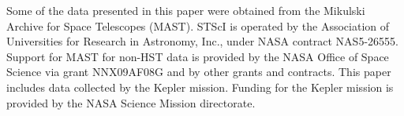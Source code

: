 \documentclass[useAMS, usenatbib, preprint, 12pt]{aastex}
\begin{document}
Some of the data presented in this paper were obtained from the Mikulski
Archive for Space Telescopes (MAST).
STScI is operated by the Association of Universities for Research in
Astronomy, Inc., under NASA contract NAS5-26555.
Support for MAST for non-HST data is provided by the NASA Office of Space
Science via grant NNX09AF08G and by other grants and contracts.
This paper includes data collected by the Kepler mission. Funding for the
Kepler mission is provided by the NASA Science Mission directorate.



\end{document}
